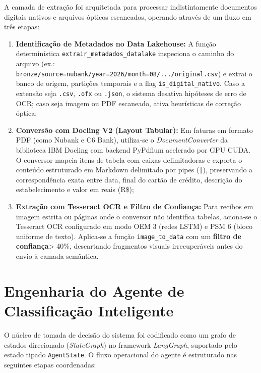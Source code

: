 \documentclass[
	12pt,				
	openright,			
	oneside,			
	a4paper,			
	english,			
	brazil				
	]{abntex2}
\begin{document}
A camada de extração foi arquitetada para processar indistintamente documentos digitais nativos e arquivos ópticos escaneados, operando através de um fluxo em três etapas:

\begin{enumerate}
    \item \textbf{Identificação de Metadados no Data Lakehouse:} A função determinística \texttt{extrair\_metadados\_datalake} inspeciona o caminho do arquivo (ex.: \texttt{bronze/source=nubank/year=2026/month=08/.../original.csv}) e extrai o banco de origem, partições temporais e a flag \texttt{is\_digital\_nativo}. Caso a extensão seja \texttt{.csv}, \texttt{.ofx} ou \texttt{.json}, o sistema desativa hipóteses de erro de OCR; caso seja imagem ou PDF escaneado, ativa heurísticas de correção óptica;
    \item \textbf{Conversão com Docling V2 (Layout Tabular):} Em faturas em formato PDF (como Nubank e C6 Bank), utiliza-se o \textit{DocumentConverter} da biblioteca IBM Docling com backend PyPdfium acelerado por GPU CUDA. O conversor mapeia itens de tabela com caixas delimitadoras e exporta o conteúdo estruturado em Markdown delimitado por pipes (\texttt{|}), preservando a correspondência exata entre data, final do cartão de crédito, descrição do estabelecimento e valor em reais (R\$);
    \item \textbf{Extração com Tesseract OCR e Filtro de Confiança:} Para recibos em imagem estrita ou páginas onde o conversor não identifica tabelas, aciona-se o Tesseract OCR configurado em modo OEM 3 (redes LSTM) e PSM 6 (bloco uniforme de texto). Aplica-se a função \texttt{image\_to\_data} com um \textbf{filtro de confiança}> 40\%, descartando fragmentos visuais irrecuperáveis antes do envio à camada semântica.
\end{enumerate}

\section{Engenharia do Agente de Classificação Inteligente}
\label{sec:sol_agente_inteligente}

O núcleo de tomada de decisão do sistema foi codificado como um grafo de estados direcionado (\textit{StateGraph}) no framework \textit{LangGraph}, suportado pelo estado tipado \texttt{AgentState}. O fluxo operacional do agente é estruturado nas seguintes etapas coordenadas:
\end{document}

